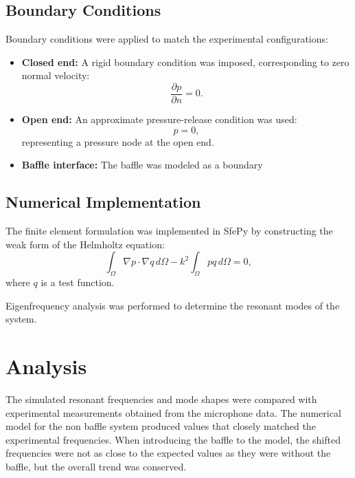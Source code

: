 \documentclass[journal, a4paper]{IEEEtran}
\begin{document}
\subsection{Boundary Conditions}

Boundary conditions were applied to match the experimental configurations:

\begin{itemize}
    \item \textbf{Closed end:} A rigid boundary condition was imposed, corresponding to zero normal velocity:
    \begin{equation}
    \frac{\partial p}{\partial n} = 0.
    \end{equation}
    
    \item \textbf{Open end:} An approximate pressure-release condition was used:
    \begin{equation}
    p = 0,
    \end{equation}
    representing a pressure node at the open end.
    
    \item \textbf{Baffle interface:} The baffle was modeled as a boundary
\end{itemize}

\subsection{Numerical Implementation}

The finite element formulation was implemented in SfePy by constructing the weak form of the Helmholtz equation:
\begin{equation}
\int_{\Omega} \nabla p \cdot \nabla q \, d\Omega - k^2 \int_{\Omega} p q \, d\Omega = 0,
\end{equation}
where $q$ is a test function.

Eigenfrequency analysis was performed to determine the resonant modes of the system. 

\section{Analysis}

The simulated resonant frequencies and mode shapes were compared with experimental measurements obtained from the microphone data. The numerical model for the non baffle system produced values that closely matched the experimental frequencies. When introducing the baffle to the model, the shifted frequencies were not as close to the expected values as they were without the baffle, but the overall trend was conserved.
\end{document}
